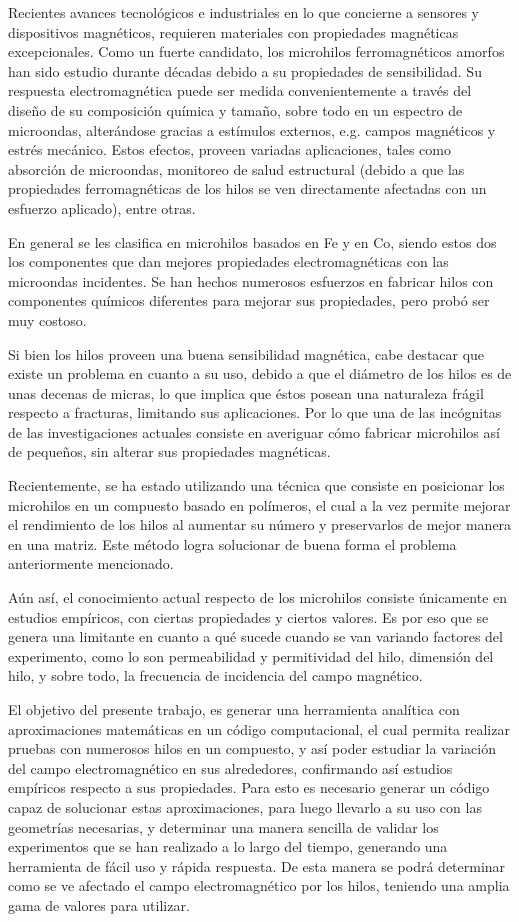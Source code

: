 \documentclass[12pt,letterpaper]{article}
\numberwithin{equation}{section}
\begin{document}
Recientes avances tecnológicos e industriales en lo que concierne a sensores y dispositivos magnéticos, requieren materiales con propiedades magnéticas excepcionales. Como un fuerte candidato, los microhilos ferromagnéticos amorfos han sido estudio durante décadas debido a su propiedades de sensibilidad. Su respuesta electromagnética puede ser medida convenientemente a través del diseño de su composición química y tamaño, sobre todo en un espectro de microondas, alterándose gracias a estímulos externos, e.g. campos magnéticos y estrés mecánico. Estos efectos, proveen variadas aplicaciones, tales como absorción de microondas, monitoreo de salud estructural (debido a que las propiedades ferromagnéticas de los hilos se ven directamente afectadas con un esfuerzo aplicado), entre otras. 


En general se les clasifica en microhilos basados en Fe y en Co, siendo estos dos los componentes que dan mejores propiedades electromagnéticas con las microondas incidentes. Se han hechos numerosos esfuerzos en fabricar hilos con componentes químicos diferentes para mejorar sus propiedades, pero probó ser muy costoso. 


Si bien los hilos proveen una buena sensibilidad magnética, cabe destacar que existe un problema en cuanto a su uso, debido a que el diámetro de los hilos es de unas decenas de micras, lo que implica que éstos posean una naturaleza frágil respecto a fracturas, limitando sus aplicaciones. Por lo que una de las incógnitas de las investigaciones actuales consiste en averiguar cómo fabricar microhilos así de pequeños, sin alterar sus propiedades magnéticas.


Recientemente, se ha estado utilizando una técnica que consiste en posicionar los microhilos en un compuesto basado en polímeros, el cual a la vez permite mejorar el rendimiento de los hilos al aumentar su número y preservarlos de mejor manera en una matriz. Este método logra solucionar de buena forma el problema anteriormente mencionado.


Aún así, el conocimiento actual respecto de los microhilos consiste únicamente en estudios empíricos, con ciertas propiedades y ciertos valores. Es por eso que se genera una limitante en cuanto a qué sucede cuando se van variando factores del experimento, como lo son permeabilidad y permitividad del hilo, dimensión del hilo, y sobre todo, la frecuencia de incidencia del campo magnético.


El objetivo del presente trabajo, es generar una herramienta analítica con aproximaciones matemáticas en un código computacional, el cual permita realizar pruebas con numerosos hilos en un compuesto, y así poder estudiar la variación del campo electromagnético en sus alrededores, confirmando así estudios empíricos respecto a sus propiedades. Para esto es necesario generar un código capaz de solucionar estas aproximaciones, para luego llevarlo a su uso con las geometrías necesarias, y determinar una manera sencilla de validar los experimentos que se han realizado a lo largo del tiempo, generando una herramienta de fácil uso y rápida respuesta. De esta manera se podrá determinar como se ve afectado el campo electromagnético por los hilos, teniendo una amplia gama de valores para utilizar.
	
\end{document}
